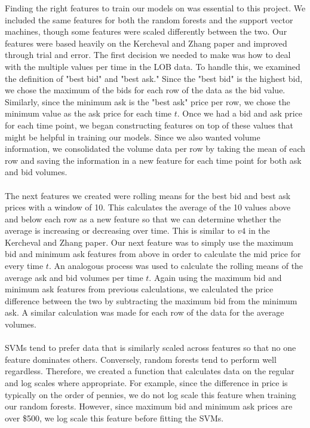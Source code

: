 \documentclass[11pt]{article}
\begin{document}
Finding the right features to train our models on was essential to this project. We included the same features for both the random forests and the support vector machines, though some features were scaled differently between the two. Our features were based heavily on the Kercheval and Zhang paper and improved through trial and error. The first decision we needed to make was how to deal with the multiple values per time in the LOB data. To handle this, we examined the definition of "best bid" and "best ask." Since the "best bid" is the highest bid, we chose the maximum of the bids for each row of the data as the bid value. Similarly, since the minimum ask is the "best ask" price per row, we chose the minimum value as the ask price for each time $t$. Once we had a bid and ask price for each time point, we began constructing features on top of these values that might be helpful in training our models. Since we also wanted volume information, we consolidated the volume data per row by taking the mean of each row and saving the information in a new feature for each time point for both ask and bid volumes.\\
\\
The next features we created were rolling means for the best bid and best ask prices with a window of 10. This calculates the average of the 10 values above and below each row as a new feature so that we can determine whether the average is increasing or decreasing over time. This is similar to $v4$ in the Kercheval and Zhang paper. Our next feature was to simply use the maximum bid and minimum ask features from above in order to calculate the mid price for every time $t$. An analogous process was used to calculate the rolling means of the average ask and bid volumes per time $t$. Again using the maximum bid and minimum ask features from previous calculations, we calculated the price difference between the two by subtracting the maximum bid from the minimum ask. A similar calculation was made for each row of the data for the average volumes.\\
\\
SVMs tend to prefer data that is similarly scaled across features so that no one feature dominates others. Conversely, random forests tend to perform well regardless. Therefore, we created a function that calculates data on the regular and log scales where appropriate. For example, since the difference in price is typically on the order of pennies, we do not log scale this feature when training our random forests. However, since maximum bid and minimum ask prices are over \$500, we log scale this feature before fitting the SVMs. \\
\end{document}
